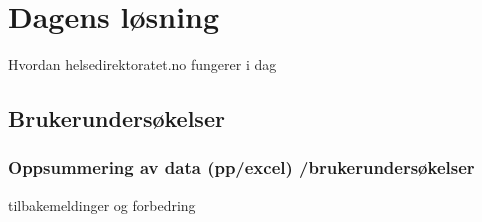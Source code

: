 \section{Dagens løsning}
Hvordan helsedirektoratet.no fungerer i dag
\subsection{Brukerundersøkelser}

\subsubsection{Oppsummering av data (pp/excel) /brukerundersøkelser}
tilbakemeldinger og forbedring

